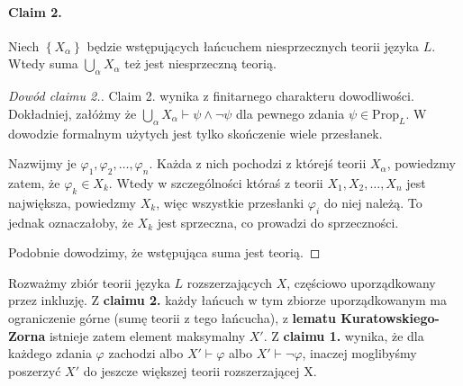 \paragraph{Claim 2.} Niech \( \left\{ X_\alpha \right\} \) będzie wstępujących łańcuchem niesprzecznych teorii języka \( L \). Wtedy suma \( \bigcup_\alpha X_\alpha \) też jest niesprzeczną teorią.

\begin{proof}[Dowód claimu 2.]
    Claim 2. wynika z finitarnego charakteru dowodliwości. Dokładniej, załóżmy że \( \bigcup_\alpha X_\alpha \vdash \psi \wedge \neg \psi \) dla pewnego zdania \( \psi \in \mathrm{Prop}_L \). W dowodzie formalnym użytych jest tylko skończenie wiele przesłanek.

    Nazwijmy je \( \varphi_1, \varphi_2, \ldots, \varphi_n \). Każda z nich pochodzi z którejś teorii \( X_\alpha \), powiedzmy zatem, że \( \varphi_k \in X_k \). Wtedy w szczególności któraś z teorii \( X_1, X_2, \ldots, X_n \) jest największa, powiedzmy \( X_k \), więc wszystkie przesłanki \( \varphi_i \) do niej należą. To jednak oznaczałoby, że \( X_k \) jest sprzeczna, co prowadzi do sprzeczności.

    Podobnie dowodzimy, że wstępująca suma jest teorią.
\end{proof}

Rozważmy zbiór teorii języka \( L \) rozszerzających \( X \), częściowo uporządkowany przez inkluzję. Z \textbf{claimu 2.} każdy łańcuch w tym zbiorze uporządkowanym ma ograniczenie górne (sumę teorii z tego łańcucha), z \textbf{lematu Kuratowskiego-Zorna} istnieje zatem element maksymalny \( X' \). Z \textbf{claimu 1.} wynika, że dla każdego zdania \( \varphi \) zachodzi albo \( X' \vdash \varphi \) albo \( X' \vdash \neg\varphi \), inaczej moglibyśmy poszerzyć \( X' \) do jeszcze większej teorii rozszerzającej X.
